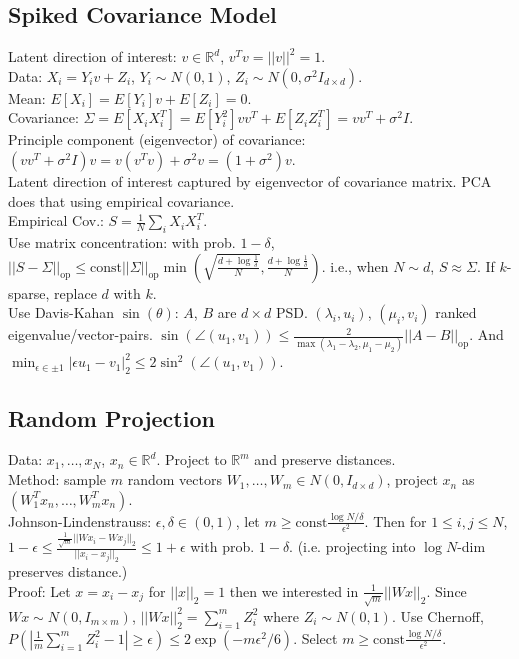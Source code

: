 \subsection*{Spiked Covariance Model}

Latent direction of interest: $v \in \mathbb{R}^d$, $v^Tv = ||v||^2 = 1$.\\
Data: $X_i = Y_i v + Z_i$, $Y_i \sim N(0, 1)$, $Z_i \sim N(0, \sigma^2I_{d\times d})$.\\
Mean: $E[X_i] = E[Y_i]v + E[Z_i] = 0$.\\
Covariance: $\Sigma = E[X_iX_i^T] = E[Y_i^2]vv^T + E[Z_iZ_i^T] = vv^T + \sigma^2I$.\\
Principle component (eigenvector) of covariance: $(vv^T + \sigma^2 I)v=v(v^Tv)+\sigma^2 v = (1+\sigma^2)v$.\\
Latent direction of interest captured by eigenvector of covariance matrix. PCA does that using empirical covariance.\\
Empirical Cov.: $S = \frac{1}{N}\sum_i X_i X_i^T$.\\
Use matrix concentration: with prob. $1-\delta$, $||S-\Sigma||_{\text{op}} \leq \text{const} ||\Sigma||_{\text{op}} \min(\sqrt{\frac{d+\log\frac{1}{\delta}}{N}}, \frac{d+\log\frac{1}{\delta}}{N})$. i.e., when $N \sim d$, $S \approx \Sigma$. If $k$-sparse, replace $d$ with $k$.\\
Use Davis-Kahan $\sin(\theta)$: $A$, $B$ are $d\times d$ PSD. $(\lambda_i, u_i)$, $(\mu_i, v_i)$ ranked eigenvalue/vector-pairs. $\sin(\angle(u_1, v_1))\leq \frac{2}{\max(\lambda_1 - \lambda_2, \mu_1 - \mu_2)} ||A-B||_{\text{op}}$. And $\min_{\epsilon\in{\pm1}}|\epsilon u_1 - v_1|_2^2 \leq 2 \sin^2(\angle(u_1, v_1))$.

\subsection*{Random Projection}

Data: $x_1, \dots, x_N$, $x_n \in \mathbb{R}^d$. Project to $\mathbb{R}^m$ and preserve distances.\\
Method: sample $m$ random vectors $W_1, \dots, W_m \in N(0, I_{d\times d})$, project $x_n$ as $(W_1^Tx_n, \dots, W_m^Tx_n)$.\\
Johnson-Lindenstrauss: $\epsilon, \delta \in (0, 1)$, let $m \geq \text{const}\frac{\log N/\delta}{\epsilon^2}$. Then for $1 \leq i, j \leq N$, $1-\epsilon \leq \frac{\frac{1}{\sqrt{m}}||W x_i - W x_j||_2}{||x_i - x_j||_2} \leq 1+\epsilon$ with prob. $1-\delta$. (i.e. projecting into $\log N$-dim preserves distance.)\\
Proof: Let $x = x_i - x_j$ for $||x||_2=1$ then we interested in $\frac{1}{\sqrt{m}}||Wx||_2$. Since $Wx \sim N(0, I_{m\times m})$, $||Wx||_2^2 = \sum_{i=1}^m Z_i^2$ where $Z_i \sim N(0, 1)$. Use Chernoff, $P(|\frac{1}{m}\sum_{i=1}^m Z_i^2-1| \geq \epsilon) \leq 2 \exp(-m\epsilon^2/6)$. Select $m \geq \text{const}\frac{\log N / \delta}{\epsilon^2}$.


